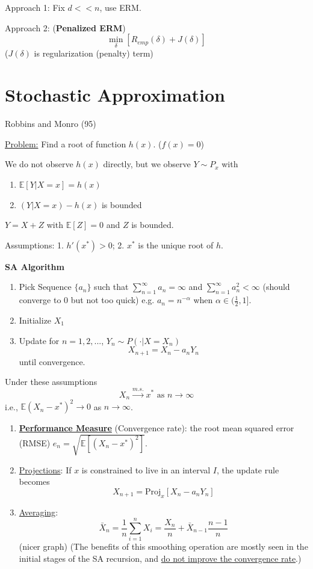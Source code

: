 \documentclass[11pt]{elegantbook}
\begin{document}
Approach 1: Fix $d<<n$, use ERM.

Approach 2: (\textbf{Penalized ERM}) $$\min_\delta [R_{emp}(\delta)+J(\delta)]$$ ($J(\delta)$ is regularization (penalty) term)

\section{Stochastic Approximation}
Robbins and Monro (95)

\underline{Problem:} Find a root of function $h(x)$. ($f(x)=0$)

We do not observe $h(x)$ directly, but we observe $Y\sim P_x$ with
\begin{enumerate}[(1)]
    \item $\mathbb{E}[Y|X=x]=h(x)$
    \item $(Y|X=x)-h(x)$ is bounded
\end{enumerate}
\begin{example}
    $Y=X+Z$ with $\mathbb{E}[Z]=0$ and $Z$ is bounded.
\end{example}
Assumptions: 1. $h'(x^*)>0$; 2. $x^*$ is the unique root of $h$.

\textbf{SA Algorithm}
\begin{enumerate}[$\bullet$]
    \item Pick Sequence $\{a_n\}$ such that $\sum_{n=1}^\infty a_n=\infty$ and $\sum_{n=1}^\infty a^2_n<\infty$ (should converge to $0$ but not too quick) e.g. $a_n=n^{-\alpha}$ when $\alpha\in (\frac{1}{2},1]$.
    \item Initialize $X_1$
    \item Update for $n=1,2,...$, $Y_n\sim P(\cdot|X=X_n)$ $$X_{n+1}=X_n-a_n Y_n$$ until convergence.
\end{enumerate}

\begin{theorem}
    Under these assumptions $$X_n \stackrel{m.s.}{\longrightarrow} x^*\text{ as }n \rightarrow \infty$$ i.e., $\mathbb{E}(X_n-x^*)^2 \rightarrow 0$ as $n \rightarrow \infty$.
\end{theorem}

\begin{enumerate}[$\bullet$]
    \item \textbf{\underline{Performance Measure}} (Convergence rate): the root mean squared error (RMSE) $e_n=\sqrt{\mathbb{E}[(X_n-x^*)^2]}$.
    \item \underline{Projections}: If $x$ is constrained to live in an interval $I$, the update rule becomes $$X_{n+1}=\text{Proj}_x[X_n-a_nY_n]$$
    \item \underline{Averaging}: $$\bar{X}_n=\frac{1}{n}\sum_{i=1}^nX_i=\frac{X_n}{n}+\bar{X}_{n-1}\frac{n-1}{n}$$(nicer graph) (The benefits of this smoothing operation are mostly seen in the initial stages of the SA recursion, and \underline{do not improve the convergence rate}.)
\end{enumerate}
\end{document}
